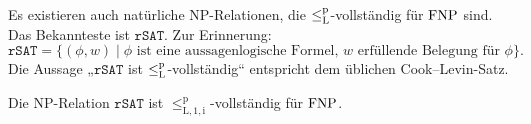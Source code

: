 Es existieren auch natürliche NP-Relationen, die $\leq_\mathrm{L}^\mathrm{p}$-vollständig für $\mathrm{FNP}$ sind.
Das Bekannteste ist $\mathtt{rSAT}$. Zur Erinnerung:
\[ \mathtt{rSAT} = \{ (\phi, w) \mid \text{$\phi$ ist eine aussagenlogische Formel, $w$ erfüllende Belegung für $\phi$} \}. \]
Die Aussage „$\mathtt{rSAT}$ ist $\leq_\mathrm{L}^\mathrm{p}$-vollständig“ entspricht dem üblichen Cook–Levin-Satz. %
\begin{theorem}
    Die NP-Relation $\mathtt{rSAT}$ ist $\leq_\mathrm{L,1,i}^\mathrm p$-vollständig für $\mathrm{FNP}$.
\end{theorem}
%
%
%

